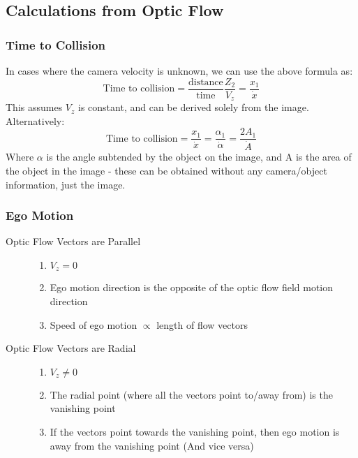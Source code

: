 \subsection{Calculations from Optic Flow}

\subsubsection{Time to Collision}
In cases where the camera velocity is unknown, we can use the above formula as:
\begin{equation}
    \text{Time to collision} = \frac{\text{distance}}{\text{time}}\frac{Z_2}{V_z} =  \frac{x_1}{\dot{x}}
\end{equation}
This assumes $V_z$ is constant, and can be derived solely from the image. Alternatively:
\begin{equation}
    \text{Time to collision} =  \frac{x_1}{\dot{x}} = \frac{\alpha_1}{\dot{\alpha}} = \frac{2A_1}{\dot{A}}
\end{equation}
Where $\alpha$ is the angle subtended by the object on the image, and A is the area of the object in the image - these can be obtained without any camera/object information, just the image. 

\subsubsection{Ego Motion}
\begin{description}
    \item[Optic Flow Vectors are Parallel]
    \begin{enumerate}
        \item $V_z = 0$
        \item Ego motion direction is the opposite of the optic flow field motion direction
        \item Speed of ego motion $\propto$ length of flow vectors
    \end{enumerate}
    \item[Optic Flow Vectors are Radial]
    \begin{enumerate}
        \item $V_z \neq 0$
        \item The radial point (where all the vectors point to/away from) is the vanishing point
        \item If the vectors point towards the vanishing point, then ego motion is away from the vanishing point (And vice versa)
    \end{enumerate}    
\end{description}

